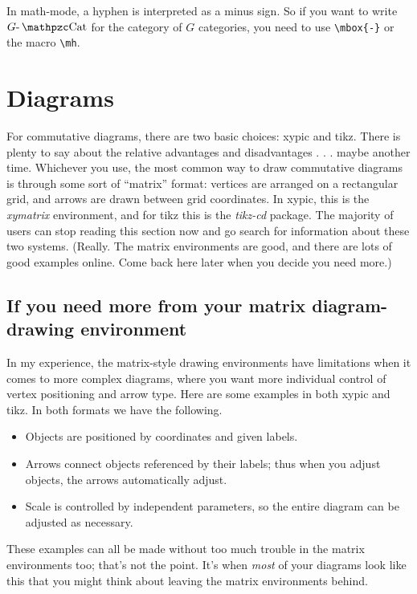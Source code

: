 \documentclass[11pt,oneside,draft]{amsart}
\begin{document}
In math-mode, a hyphen is interpreted as a minus sign.  So if you want
to write $G\mh\Cat$ for the category of $G$ categories, you need to
use \verb|\mbox{-}| or the macro \verb|\mh|.

\section{Diagrams}

For commutative diagrams, there are two basic choices: xypic and tikz.
There is plenty to say about the relative advantages and disadvantages
. . . maybe another time.  Whichever you use, the most common way to
draw commutative diagrams is through some sort of ``matrix'' format:
vertices are arranged on a rectangular grid, and arrows are drawn
between grid coordinates.  In xypic, this is the \emph{xymatrix}
environment, and for tikz this is the \emph{tikz-cd} package.  The
majority of users can stop reading this section now and go search for
information about these two systems.  (Really.  The matrix
environments are good, and there are lots of good examples online.
Come back here later when you decide you need more.)


\subsection{If you need more from your matrix diagram-drawing
  environment}
In my experience, the matrix-style drawing environments have
limitations when it comes to more complex diagrams, where you want
more individual control of vertex positioning and arrow type.  Here
are some examples in both xypic and tikz.  In both formats we have the following.

\begin{itemize}
\item Objects are positioned by coordinates and given labels.
\item Arrows connect objects referenced by their labels; thus when you
  adjust objects, the arrows automatically adjust.
\item Scale is controlled by independent parameters, so the entire
  diagram can be adjusted as necessary.
\end{itemize}

These examples can all be made without too much trouble in the matrix
environments too; that's not the point.  It's when \emph{most} of your
diagrams look like this that you might think about leaving the
matrix environments behind.
\end{document}
